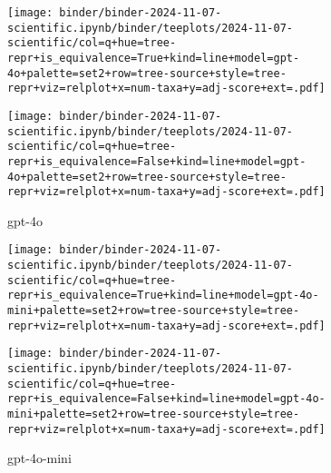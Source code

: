 \begin{figure*}

\begin{subfigure}{\textwidth}
\begin{minipage}[b]{0.7365\textwidth}
\texttt{[image: binder/binder-2024-11-07-scientific.ipynb/binder/teeplots/2024-11-07-scientific/col=q+hue=tree-repr+is\_equivalence=True+kind=line+model=gpt-4o+palette=set2+row=tree-source+style=tree-repr+viz=relplot+x=num-taxa+y=adj-score+ext=.pdf]}
\end{minipage}%
\begin{minipage}[b]{0.01\textwidth}
\end{minipage}
\begin{minipage}[b]{0.2535\textwidth}
\texttt{[image: binder/binder-2024-11-07-scientific.ipynb/binder/teeplots/2024-11-07-scientific/col=q+hue=tree-repr+is\_equivalence=False+kind=line+model=gpt-4o+palette=set2+row=tree-source+style=tree-repr+viz=relplot+x=num-taxa+y=adj-score+ext=.pdf]}
\end{minipage}
\caption{\footnotesize gpt-4o}
\label{fig:treerepr:gpt-4o}
\end{subfigure}

\begin{subfigure}{\textwidth}
\begin{minipage}[b]{0.7365\textwidth}
\texttt{[image: binder/binder-2024-11-07-scientific.ipynb/binder/teeplots/2024-11-07-scientific/col=q+hue=tree-repr+is\_equivalence=True+kind=line+model=gpt-4o-mini+palette=set2+row=tree-source+style=tree-repr+viz=relplot+x=num-taxa+y=adj-score+ext=.pdf]}
\end{minipage}%
\begin{minipage}[b]{0.01\textwidth}
\end{minipage}
\begin{minipage}[b]{0.2535\textwidth}
\texttt{[image: binder/binder-2024-11-07-scientific.ipynb/binder/teeplots/2024-11-07-scientific/col=q+hue=tree-repr+is\_equivalence=False+kind=line+model=gpt-4o-mini+palette=set2+row=tree-source+style=tree-repr+viz=relplot+x=num-taxa+y=adj-score+ext=.pdf]}
\end{minipage}
\caption{\footnotesize gpt-4o-mini}
\label{fig:treerepr:gpt-4o-mini}
\end{subfigure}


\end{figure*}
